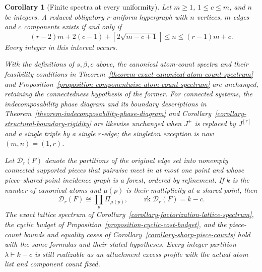\documentclass[a4paper,11pt,reqno]{amsart}
\theoremstyle{plain}
\newtheorem{corollary}[theorem]{Corollary}
\theoremstyle{definition}
\theoremstyle{remark}
\begin{document}
\begin{corollary}[Finite spectra at every uniformity]
\label{uniform-finite-spectra}
Let $m\ge1$, $1\le c\le m$, and $n$ be integers.  A reduced obligatory $r$-uniform
hypergraph with $n$ vertices, $m$ edges and $c$ components exists if and
only if
\[
 \boxed{
 (r-2)m+2(c-1)+\left\lceil2\sqrt{m-c+1}\right\rceil
 \le n\le (r-1)m+c.
 }
\]
Every integer in this interval occurs.

With the definitions of $s,\beta,c$ above, the canonical atom-count
spectra and their feasibility conditions in
Theorem~\ref{theorem-exact-canonical-atom-count-spectrum} and
Proposition~\ref{proposition-componentwise-atom-count-spectrum} are
unchanged, retaining the connectedness hypothesis of the former.
For connected systems, the indecomposability phase diagram and its boundary
descriptions in Theorem~\ref{theorem-indecomposability-phase-diagram}
and Corollary~\ref{corollary-structural-boundary-rigidity} are likewise
unchanged when $J^+$ is replaced by $J^{[r]}$ and a single triple by a
single $r$-edge; the singleton exception is now $(m,n)=(1,r)$.

Let $\mathcal D_r(F)$ denote the partitions of the original edge set into
nonempty connected supported pieces that pairwise meet in at most one
point and whose piece--shared-point incidence graph is a forest, ordered
by refinement.  If $k$ is the number of canonical atoms and $\mu(p)$
is their multiplicity at a shared point, then
\[
 \mathcal D_r(F)\cong\prod_p\Pi_{\mu(p)},
 \qquad
 \operatorname{rk}\mathcal D_r(F)=k-c.
\]
The exact lattice spectrum of
Corollary~\ref{corollary-factorization-lattice-spectrum}, the cyclic
budget of Proposition~\ref{proposition-cyclic-cost-budget}, and the
piece-count bounds and equality cases of
Corollary~\ref{corollary-sharp-piece-counts} hold with the same formulas
and their stated hypotheses.  Every integer partition $\lambda\vdash k-c$
is still realizable as an attachment excess profile with the actual atom
list and component count fixed.
\end{corollary}
\end{document}
